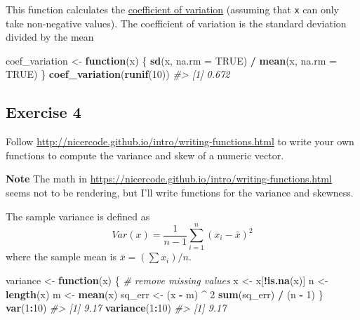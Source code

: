 \documentclass[]{book}
\newenvironment{Shaded}{\begin{snugshade}}{\end{snugshade}}
\newcommand{\CommentTok}[1]{\textcolor[rgb]{0.56,0.35,0.01}{\textit{#1}}}
\newcommand{\ControlFlowTok}[1]{\textcolor[rgb]{0.13,0.29,0.53}{\textbf{#1}}}
\newcommand{\DataTypeTok}[1]{\textcolor[rgb]{0.13,0.29,0.53}{#1}}
\newcommand{\DecValTok}[1]{\textcolor[rgb]{0.00,0.00,0.81}{#1}}
\newcommand{\KeywordTok}[1]{\textcolor[rgb]{0.13,0.29,0.53}{\textbf{#1}}}
\newcommand{\NormalTok}[1]{#1}
\newcommand{\OperatorTok}[1]{\textcolor[rgb]{0.81,0.36,0.00}{\textbf{#1}}}
\newcommand{\OtherTok}[1]{\textcolor[rgb]{0.56,0.35,0.01}{#1}}
\newcommand{\StringTok}[1]{\textcolor[rgb]{0.31,0.60,0.02}{#1}}
\theoremstyle{plain}
\theoremstyle{remark}
\theoremstyle{definition}
\theoremstyle{definition}
\theoremstyle{definition}
\theoremstyle{remark}
\begin{document}
This function calculates the
\href{https://en.wikipedia.org/wiki/Coefficient_of_variation}{coefficient
of variation} (assuming that \texttt{x} can only take non-negative
values). The coefficient of variation is the standard deviation divided
by the mean

\begin{Shaded}
\begin{Highlighting}[]
\NormalTok{coef_variation <-}\StringTok{ }\ControlFlowTok{function}\NormalTok{(x) \{}
  \KeywordTok{sd}\NormalTok{(x, }\DataTypeTok{na.rm =} \OtherTok{TRUE}\NormalTok{) }\OperatorTok{/}\StringTok{ }\KeywordTok{mean}\NormalTok{(x, }\DataTypeTok{na.rm =} \OtherTok{TRUE}\NormalTok{)}
\NormalTok{\}}
\KeywordTok{coef_variation}\NormalTok{(}\KeywordTok{runif}\NormalTok{(}\DecValTok{10}\NormalTok{))}
\CommentTok{#> [1] 0.672}
\end{Highlighting}
\end{Shaded}

\hypertarget{exercise-4-26}{%
\subsection{Exercise 4}\label{exercise-4-26}}

Follow \url{http://nicercode.github.io/intro/writing-functions.html} to
write your own functions to compute the variance and skew of a numeric
vector.

\textbf{Note} The math in
\url{https://nicercode.github.io/intro/writing-functions.html} seems not
to be rendering, but I'll write functions for the variance and skewness.

The sample variance is defined as \[
Var(x) = \frac{1}{n - 1} \sum_{i=1}^n (x_i - \bar{x}) ^2
\] where the sample mean is \(\bar{x} = (\sum x_i) / n\).

\begin{Shaded}
\begin{Highlighting}[]
\NormalTok{variance <-}\StringTok{ }\ControlFlowTok{function}\NormalTok{(x) \{}
  \CommentTok{# remove missing values}
\NormalTok{  x <-}\StringTok{ }\NormalTok{x[}\OperatorTok{!}\KeywordTok{is.na}\NormalTok{(x)]}
\NormalTok{  n <-}\StringTok{ }\KeywordTok{length}\NormalTok{(x)}
\NormalTok{  m <-}\StringTok{ }\KeywordTok{mean}\NormalTok{(x)}
\NormalTok{  sq_err <-}\StringTok{ }\NormalTok{(x }\OperatorTok{-}\StringTok{ }\NormalTok{m) }\OperatorTok{^}\StringTok{ }\DecValTok{2}
  \KeywordTok{sum}\NormalTok{(sq_err) }\OperatorTok{/}\StringTok{ }\NormalTok{(n }\OperatorTok{-}\StringTok{ }\DecValTok{1}\NormalTok{)}
\NormalTok{\}}
\KeywordTok{var}\NormalTok{(}\DecValTok{1}\OperatorTok{:}\DecValTok{10}\NormalTok{)}
\CommentTok{#> [1] 9.17}
\KeywordTok{variance}\NormalTok{(}\DecValTok{1}\OperatorTok{:}\DecValTok{10}\NormalTok{)}
\CommentTok{#> [1] 9.17}
\end{Highlighting}
\end{Shaded}
\end{document}
